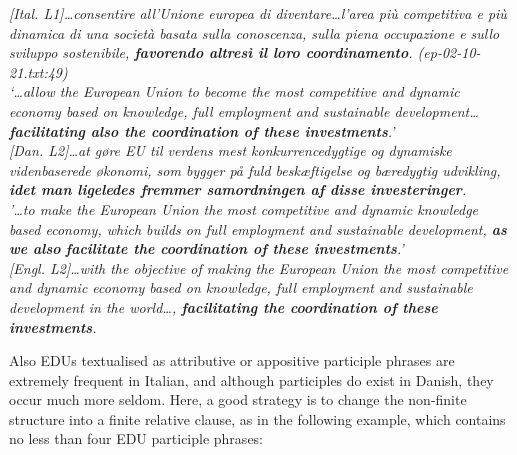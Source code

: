 \documentclass[output=paper]{LSP/langsci}
\begin{document}
\ea\label{ex:korzen:21}
\textit{\textup{[Ital. L1]}\ldots consentire all'Unione europea di diventare\ldots  l'area più competitiva e più dinamica di una società basata sulla conoscenza, sulla piena occupazione e sullo sviluppo sostenibile, \textbf{favorendo altresì il loro coordinamento}. \textup{(ep-02-10-21.txt:49)}\\
\textup{`}\ldots allow the European Union to become the most competitive and dynamic economy based on knowledge, full employment and sustainable development\ldots  \textbf{facilitating also the coordination of these investments}.'\\
  \textup{[Dan. L2]}\ldots at gøre EU til verdens mest konkurrencedygtige og dynamiske videnbaserede økonomi, som bygger på fuld beskæftigelse og bæredygtig udvikling, \textbf{idet man ligeledes fremmer samordningen af disse investeringer}.\\
  '\ldots to make the European Union the most competitive and dynamic knowledge based economy, which builds on full employment and sustainable development, \textbf{as we also} \textbf{facilitate the coordination of these investments}.'\\
  \textup{[Engl. L2]}\ldots with the objective of making the European Union the most competitive and dynamic economy based on knowledge, full employment and sustainable development in the world\ldots , \textbf{facilitating the coordination of these investments}.}
\z

Also EDUs textualised as attributive or appositive participle phrases are extremely frequent in Italian, and although participles do exist in Danish, they occur much more seldom. Here, a good strategy is to change the non-finite structure into a finite relative clause, as in the following example, which contains no less than four EDU participle phrases:
\end{document}
